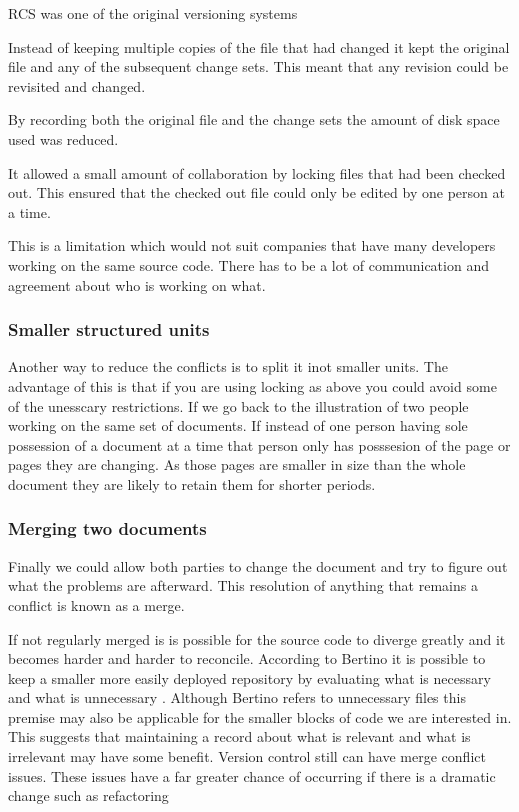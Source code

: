 RCS was one of the original versioning systems 

Instead of keeping multiple copies of the file that had changed it kept the original file and any of the subsequent change sets.
This meant that any revision could be revisited and changed.

By recording both the original file and the change sets the amount of disk space used was reduced. 

It allowed a small amount of collaboration by locking files that had been checked out.
This ensured that the checked out file could only be edited by one person at a time.

This is a limitation which would not suit companies that have many developers working on the same source code.  
There has to be a lot of communication and agreement about who is working on what.
\subsubsection{Smaller structured units}
Another way to reduce the conflicts is to split it inot smaller units.  The advantage of this is that if you are using locking as above you could avoid some of the unesscary restrictions. If we go back to the illustration of two people working on the same set of documents.  If instead of one person having sole possession of a document at a time that person only has posssesion of the page or pages they are changing. As those pages are smaller in size than the whole document they are likely to retain them for shorter periods.
\subsubsection{Merging two documents}
Finally we could allow both parties to change the document and try to figure out what the problems are afterward.  This resolution of anything that remains a conflict is known as a merge.

If not regularly merged is is possible for the source code to diverge greatly and it becomes harder and harder to reconcile.
 According to Bertino it is possible to keep a smaller more easily deployed repository by evaluating what is necessary and what is unnecessary \cite{Bertino2012}. Although Bertino refers to unnecessary files this premise may also be applicable for the smaller blocks of code we are interested in. This suggests that maintaining a record about what is relevant and what is irrelevant may have some benefit. Version control still can have merge conflict issues. These issues have a far greater chance of occurring if there is a dramatic change such as refactoring
 
